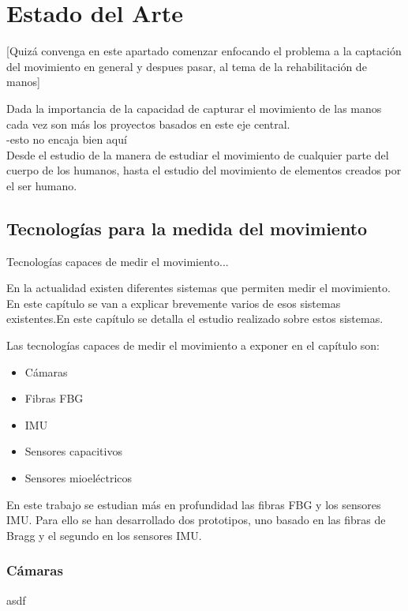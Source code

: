 \chapter{Estado del Arte\label{sec:estado_del_arte}}

[Quizá convenga en este apartado comenzar enfocando el problema a la captación del movimiento en general y despues pasar, al tema de la rehabilitación de manos]

Dada la importancia de la capacidad de capturar el movimiento de las manos cada vez son más los proyectos basados en este eje central.\\
-esto no encaja bien aquí  \\
Desde el estudio de la manera de estudiar el movimiento de cualquier parte del cuerpo de los humanos, hasta el estudio del movimiento de elementos creados por el ser humano. \\ %



\section{Tecnologías para la medida del movimiento}
\label{sec:tecnologias2}

Tecnologías capaces de medir el movimiento...


En la actualidad existen diferentes sistemas que permiten medir el movimiento. En este capítulo se van a explicar brevemente varios de esos sistemas existentes.En este capítulo se detalla el estudio realizado sobre estos sistemas.


Las tecnologías capaces de medir el movimiento a exponer en el capítulo son:
\begin{itemize}
	\item {Cámaras}
	\item {Fibras FBG}
	\item {IMU}
	\item {Sensores capacitivos}
	\item {Sensores mioeléctricos}
\end{itemize}

En este trabajo se estudian más en profundidad las fibras FBG y los sensores IMU. Para ello se han desarrollado dos prototipos, uno basado en las fibras de Bragg y el segundo en los sensores IMU.

\subsection{Cámaras}
\label{sec:camaras2}
asdf

